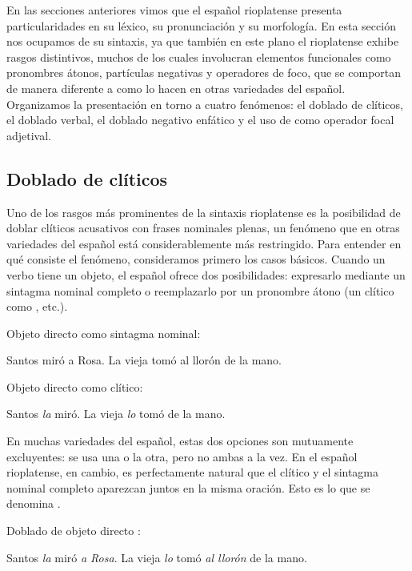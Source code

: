 En las secciones anteriores vimos que el español rioplatense presenta
particularidades en su léxico, su pronunciación y su morfología. En esta sección
nos ocupamos de su sintaxis, ya que también en este plano el rioplatense exhibe
rasgos distintivos, muchos de los cuales involucran elementos funcionales como
pronombres átonos, partículas negativas y operadores de foco, que se comportan de
manera diferente a como lo hacen en otras variedades del español. Organizamos la
presentación en torno a cuatro fenómenos: el doblado de clíticos, el doblado
verbal, el doblado negativo enfático y el uso de  como operador
focal adjetival.

\subsection{Doblado de clíticos}\label{sec:15-doblado}

Uno de los rasgos más prominentes de la sintaxis rioplatense es la posibilidad de
doblar clíticos acusativos con frases nominales plenas, un fenómeno que en otras
variedades del español está considerablemente más restringido. Para entender en
qué consiste el fenómeno, consideramos primero los casos básicos. Cuando un verbo
tiene un objeto, el español ofrece dos posibilidades: expresarlo mediante un
sintagma nominal completo o reemplazarlo por un pronombre átono (un clítico como
, etc.).

\begin{exe}
  \ex\label{ex:15-od-sn} Objeto directo como sintagma nominal:
    \begin{xlist}
      \ex Santos miró a Rosa.
      \ex La vieja tomó al llorón de la mano.
    \end{xlist}
  \ex\label{ex:15-od-cl} Objeto directo como clítico:
    \begin{xlist}
      \ex Santos \textit{la} miró.
      \ex La vieja \textit{lo} tomó de la mano.
    \end{xlist}
\end{exe}

En muchas variedades del español, estas dos opciones son mutuamente excluyentes:
se usa una o la otra, pero no ambas a la vez. En el español rioplatense, en
cambio, es perfectamente natural que el clítico y el sintagma nominal completo
aparezcan juntos en la misma oración. Esto es lo que se denomina .

\begin{exe}
  \ex\label{ex:15-doblado} Doblado de objeto directo \parencite[adaptado
      de][148]{kany1969}:
    \begin{xlist}
      \ex Santos \textit{la} miró \textit{a Rosa}.
      \ex La vieja \textit{lo} tomó \textit{al llorón} de la mano.
    \end{xlist}
\end{exe}

